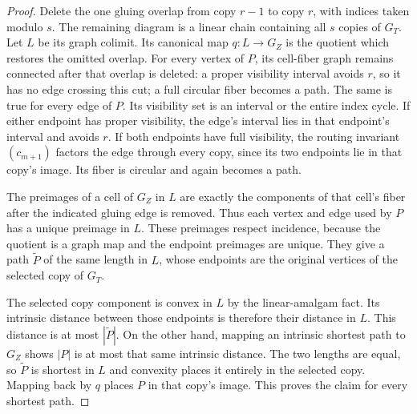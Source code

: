 \begin{proof}
Delete the one gluing overlap from copy $r-1$ to copy $r$, with indices
taken modulo $s$. The remaining diagram is a linear chain containing
all $s$ copies of $G_T$. Let $L$ be its graph colimit. Its canonical
map $q:L\to G_Z$ is the quotient which restores the omitted overlap.
For every vertex of $P$, its cell-fiber graph remains connected after
that overlap is deleted: a proper visibility interval avoids $r$,
so it has no edge crossing this cut; a full circular fiber becomes
a path. The same is true for every edge of $P$. Its visibility set
is an interval or the entire index cycle. If either endpoint has
proper visibility, the edge's interval lies in that endpoint's
interval and avoids $r$. If both endpoints have full visibility,
the routing invariant $(c_{m+1})$ factors the edge through every
copy, since its two endpoints lie in that copy's image. Its fiber
is circular and again becomes a path.

The preimages of a cell of $G_Z$ in $L$ are exactly the components of
that cell's fiber after the indicated gluing edge is removed.
Thus each vertex and edge used by $P$ has a unique preimage in $L$.
These preimages respect incidence, because the quotient is a graph
map and the endpoint preimages are unique. They give a path
$\widetilde P$ of the same length in $L$, whose endpoints are the
original vertices of the selected copy of $G_T$.

The selected copy component is convex in $L$ by the linear-amalgam
fact. Its intrinsic distance between those endpoints is therefore
their distance in $L$. This distance is at most $|\widetilde P|$.
On the other hand, mapping an intrinsic shortest path to $G_Z$
shows $|P|$ is at most that same intrinsic distance. The two lengths
are equal, so $\widetilde P$ is shortest in $L$ and convexity places
it entirely in the selected copy. Mapping back by $q$ places $P$
in that copy's image. This proves the claim for every shortest path.
\end{proof}

